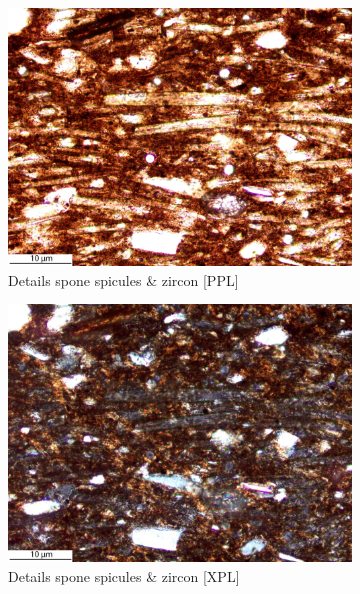 \documentclass[a4paper]{article}
\begin{document}
\begin{figure}[H]
\begin{subfigure}[t]{.32\textwidth}
		\includegraphics[width=\textwidth]{ThinSections/108-3_20x_PPL.jpg}
		\caption{Details spone spicules \& zircon [PPL]}
	\end{subfigure}\hspace{.1em}\hfill
	\begin{subfigure}[t]{.32\textwidth}
		\includegraphics[width=\textwidth]{ThinSections/108-3_20x_XPL.jpg}
		\caption{Details spone spicules \& zircon [XPL]}
	\end{subfigure}\hspace{.1em}\hfill
	\begin{subfigure}[t]{.32\textwidth}

\end{subfigure}
\end{figure}
\end{document}
